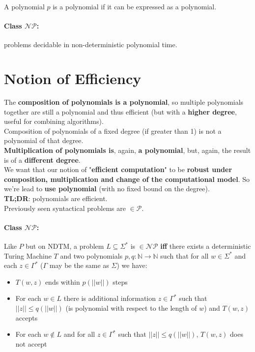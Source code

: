 	A polynomial $p$ is a polynomial if it can be expressed as a polynomial.\\

	\paragraph{Class $\mathcal{NP}$:} problems decidable in non-deterministic polynomial time.\\

	\newpage

	\section*{Notion of Efficiency}

	The \textbf{composition of polynomials is a polynomial}, so multiple polynomials together are still a polynomial and thus efficient (but with a \textbf{higher degree}, useful for combining algorithms).\\
	Composition of polynomials of a fixed degree (if greater than 1) is not a polynomial of that degree.\\

	\textbf{Multiplication of polynomials is}, again, \textbf{a polynomial}, but, again, the result is of a \textbf{different degree}.\\

	We want that our notion of "\textbf{efficient computation}" to be \textbf{robust under composition, multiplication and change of the computational model}. So we're lead to \textbf{use polynomial} (with no fixed bound on the degree).\\

	\textbf{TL;DR}: polynomials are efficient.\\

	Previously seen syntactical problems are $\in \mathcal{P}$.\\


	\vfill

	\paragraph{Class $\mathcal{NP}$:} Like $P$ but on NDTM, a problem $L \subseteq \Sigma^\ast$ is $\in \mathcal{NP}$ \textbf{iff} there exists a deterministic Turing Machine $T$ and two polynomials $p,q:\mathbb{N} \rightarrow \mathbb{N}$ such that for all $w \in \Sigma^\ast$ and each $z \in \Gamma^\ast$ ($\Gamma$ may be the same as $\Sigma$) we have:
	\begin{itemize}
		\item $T(w,z)$ ends within $p(||w||)$ steps
		\item For each $w \in L$ there is additional information $z \in \Gamma^\ast$ such that $||z|| \leq q (||w||)$ (is polynomial with respect to the length of $w$) and $T(w,z)$ accepts
		\item For each $w \notin L$ and for all $z \in \Gamma^\ast$ such that $||z|| \leq q(||w||)$, $T(w,z)$ does not accept
	\end{itemize}


